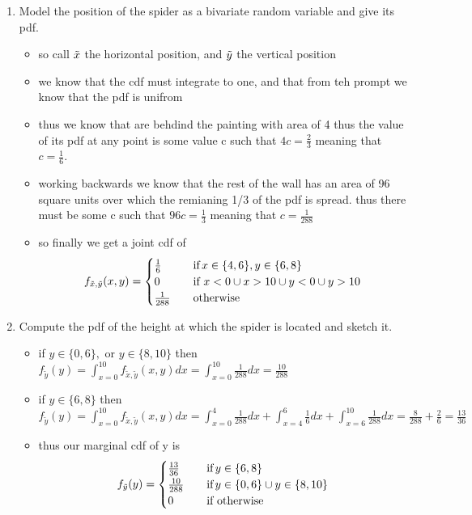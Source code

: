 \documentclass[12pt,twoside]{article}
\begin{document}
\begin{enumerate}
\begin{enumerate}
\item Model the position of the spider as a bivariate random variable and give its pdf.
\begin{itemize}
    \item so call $\Tilde{x}$ the horizontal position, and $\Tilde{y}$ the vertical position 
    \item we know that the cdf must integrate to one, and that from teh prompt we know that the pdf is unifrom 
    \item thus we know that are behdind the painting with area of 4 thus the value of its pdf at any point is some value c such that $4c=\frac{2}{3}$ meaning that $c=\frac{1}{6}$. 
    \item working backwards we know that the rest of the wall has an area of 96 square units over which the remianing 1/3 of the pdf is spread. thus there must be some c such that $96c=\frac{1}{3}$ meaning that $c=\frac{1}{288}$
    \item so finally we get a joint cdf of 
\begin{equation*}
f_{\Tilde{x}, \Tilde{y}}(x,y)=\begin{cases}
         \frac{1}{6} \quad &\text{if} \, x \in \{4,6\}, y\in\{6,8\} \\
         0 & \text{if }x<0\cup x>10 \cup y<0\cup y>10 \\
          \frac{1}{288} \quad &\text{otherwise} \,  \\
     \end{cases}
\end{equation*}

\end{itemize}
\item Compute the pdf of the height at which the spider is located and sketch it.
\begin{itemize}
        \item if $y\in \{0,6\}, \text{ or }  y\in \{8,10\}$ then $f_{\tilde{y}}(y)=\int_{x=0}^{10}f_{\tilde{x}, \tilde{y}}(x,y)dx=\int_{x=0}^{10}\frac{1}{288}dx=\frac{10}{288}$
        \item if $y\in \{6,8\}$ then $f_{\tilde{y}}(y)=\int_{x=0}^{10}f_{\tilde{x}, \tilde{y}}(x,y)dx=\int_{x=0}^{4}\frac{1}{288}dx+\int_{x=4}^{6}\frac{1}{6}dx+\int_{x=6}^{10}\frac{1}{288}dx=\frac{8}{288}+\frac{2}{6}=\frac{13}{36}$
        \item thus our marginal cdf of y is 
        \begin{equation*}
f_{ \Tilde{y}}(y)=\begin{cases}
         \frac{13}{36} \quad &\text{if} \,  y\in\{6,8\} \\
        \frac{10}{288} \quad &\text{if} \,  y\in\{0,6\} \cup y\in\{8,10\}  \\
         0 & \text{if } \text{otherwise}   \\
     \end{cases}
\end{equation*}


\end{itemize}
\end{enumerate}
\end{enumerate}
\end{document}
